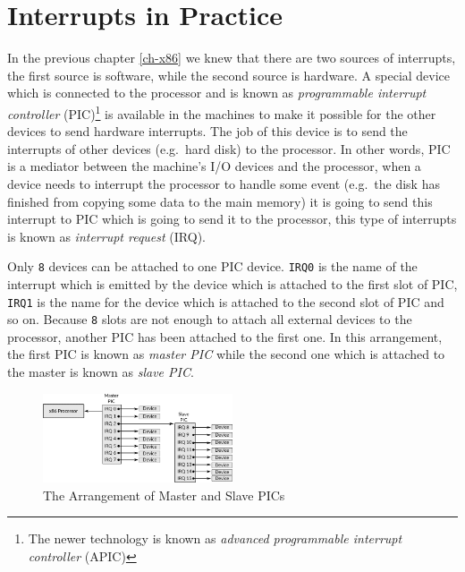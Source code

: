 \section{Interrupts in Practice}\label{interrupts-in-practice}

In the previous chapter \ref{ch-x86} we knew that there are two sources
of interrupts, the first source is software, while the second source is
hardware. A special device which is connected to the processor and is
known as \emph{programmable interrupt controller} (PIC)\footnote{The
  newer technology is known as \emph{advanced programmable interrupt
  controller} (APIC)} is available in the machines to make it possible
for the other devices to send hardware interrupts. The job of this
device is to send the interrupts of other devices (e.g.~hard disk) to
the processor. In other words, PIC is a mediator between the machine's
I/O devices and the processor, when a device needs to interrupt the
processor to handle some event (e.g.~the disk has finished from copying
some data to the main memory) it is going to send this interrupt to PIC
which is going to send it to the processor, this type of interrupts is
known as \emph{interrupt request} (IRQ).

Only \lstinline!8! devices can be attached to one PIC device.
\lstinline!IRQ0! is the name of the interrupt which is emitted by the
device which is attached to the first slot of PIC, \lstinline!IRQ1! is
the name for the device which is attached to the second slot of PIC and
so on. Because \lstinline!8! slots are not enough to attach all external
devices to the processor, another PIC has been attached to the first
one. In this arrangement, the first PIC is known as \emph{master PIC}
while the second one which is attached to the master is known as
\emph{slave PIC}.

\begin{figure}
\centering
\includegraphics[width=0.50000\textwidth]{Figures/progenitor-ch/Fig21082021_0.png}
\caption{The Arrangement of Master and Slave PICs}\label{fig:21082021_0}
\end{figure}


